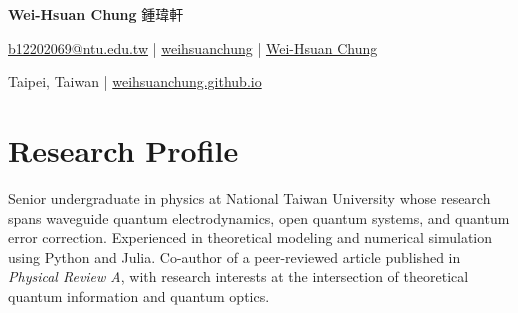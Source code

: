 \documentclass[a4paper,11pt]{article}
\newcommand{\socialicon}[1]{\raisebox{-0.05em}{\resizebox{!}{1em}{#1}}}
\newcommand{\headerfontiii}{\fontfamily{ppl}\selectfont} %
\begin{document}

\begin{center}
  {\Huge\textbf{Wei-Hsuan Chung} 鍾瑋軒}
\end{center}
\vspace{-6mm}

\begin{center}
    \small{
    \href{mailto:b12202069@ntu.edu.tw}{b12202069@ntu.edu.tw} | 
    \socialicon{\faGithub} \href{https://github.com/weihsuanchung}{weihsuanchung} |
    \socialicon{\faLinkedin} \href{https://www.linkedin.com/in/wei-hsuan-chung-a98782386?utm_source=share&utm_campaign=share_via&utm_content=profile&utm_medium=android_app}{Wei-Hsuan Chung}
    }
\end{center}
\vspace{-8mm}
\begin{center}
    \small{Taipei, Taiwan} | \socialicon{\faIcon{globe}} \href{https://weihsuanchung.github.io/}{weihsuanchung.github.io}
\end{center}

\vspace{-5mm}

\section{\textbf{Research Profile}}

Senior undergraduate in physics at National Taiwan University whose research spans waveguide quantum electrodynamics, open quantum systems, and quantum
error correction. Experienced in theoretical modeling and numerical simulation using Python and Julia. Co-author of a peer-reviewed article published in \textit{Physical Review A}, with research interests at the intersection of theoretical quantum information and quantum optics.




\end{document}
